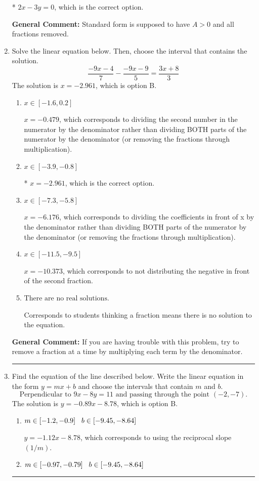 \documentclass{extbook}[14pt]
\newcommand{\litem}[1]{\item #1

\rule{\textwidth}{0.4pt}}
\begin{document}
\begin{enumerate}
{\begin{enumerate}[label=\Alph*.]
* $2x - 3y = 0$, which is the correct option.
\end{enumerate}

\textbf{General Comment:} Standard form is supposed to have $A > 0$ and all fractions removed.
}
\litem{
Solve the linear equation below. Then, choose the interval that contains the solution.
\[ \frac{-9x -4}{7} - \frac{-9x -9}{5} = \frac{3x + 8}{3} \]The solution is \( x = -2.961 \), which is option B.\begin{enumerate}[label=\Alph*.]
\item \( x \in [-1.6, 0.2] \)

 $x = -0.479$, which corresponds to dividing the second number in the numerator by the denominator rather than dividing BOTH parts of the numerator by the denominator (or removing the fractions through multiplication).
\item \( x \in [-3.9, -0.8] \)

* $x = -2.961$, which is the correct option.
\item \( x \in [-7.3, -5.8] \)

 $x = -6.176$, which corresponds to dividing the coefficients in front of x by the denominator rather than dividing BOTH parts of the numerator by the denominator (or removing the fractions through multiplication).
\item \( x \in [-11.5, -9.5] \)

 $x = -10.373$, which corresponds to not distributing the negative in front of the second fraction.
\item \( \text{There are no real solutions.} \)

Corresponds to students thinking a fraction means there is no solution to the equation.
\end{enumerate}

\textbf{General Comment:} If you are having trouble with this problem, try to remove a fraction at a time by multiplying each term by the denominator.
}
\litem{
Find the equation of the line described below. Write the linear equation in the form $ y=mx+b $ and choose the intervals that contain $m$ and $b$.
\[ \text{Perpendicular to } 9 x - 8 y = 11 \text{ and passing through the point } (-2, -7). \]The solution is \( y = -0.89x - 8.78 \), which is option B.\begin{enumerate}[label=\Alph*.]
\item \( m \in [-1.2, -0.9] \hspace*{3mm} b \in [-9.45, -8.64] \)

 $y = -1.12x - 8.78$, which corresponds to using the reciprocal slope $(1/m)$.
\item \( m \in [-0.97, -0.79] \hspace*{3mm} b \in [-9.45, -8.64] \)


\end{enumerate}}
\end{enumerate}
\end{document}
